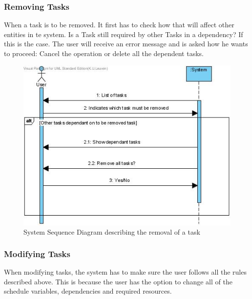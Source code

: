 			\subsubsection{Removing Tasks}
			When a task is to be removed. It first has to check how that will affect other entities in te system. Is a Task still required by other Tasks in a dependency?
			If this is the case. The user will receive an error message and is asked how he wants to proceed: Cancel the operation or delete all the dependent tasks.
			\begin{figure}[h!]
				\begin{center}
					\includegraphics[scale=0.5]{images/ssd_remove_task.jpg}
				\end{center}
				\caption{System Sequence Diagram describing the removal of a task}
			\end{figure}
			\subsubsection{Modifying Tasks}
			When modifying tasks, the system has to make sure the user follows all the rules described above. This is because the user has the option to change all of the schedule variables, dependencies and required resources.


